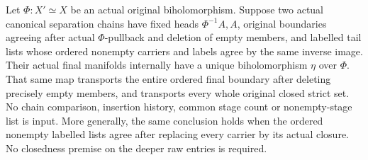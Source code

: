 \begin{theorem}
\label{hir:original-canonical-separation-chain-filtered-choice}
\leanok
Let $\Phi:X'\simeq X$ be an actual original biholomorphism. Suppose
two actual canonical separation chains have fixed heads $\Phi^{-1}A,A$,
original boundaries agreeing after actual $\Phi$-pullback and deletion
of empty members, and labelled tail lists whose ordered nonempty
carriers and labels agree by the same inverse image. Their actual final
manifolds internally have a unique biholomorphism $\eta$ over $\Phi$.
That same map transports the entire ordered final boundary after deleting
precisely empty members, and transports every whole original closed
strict set. No chain comparison, insertion history, common stage count
or nonempty-stage list is input.
More generally, the same conclusion holds when the ordered nonempty
labelled lists agree after replacing every carrier by its actual closure.
No closedness premise on the deeper raw entries is required.
\end{theorem}
